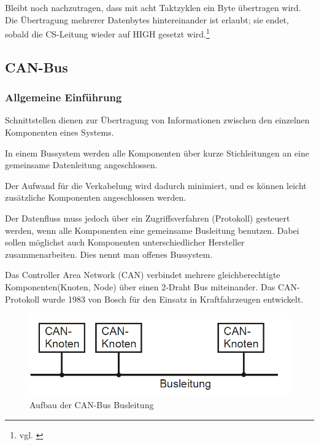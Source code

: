 Bleibt noch nachzutragen, dass mit acht Taktzyklen ein Byte übertragen wird. Die Übertragung mehrerer Datenbytes hintereinander ist erlaubt; sie endet, sobald die CS-Leitung wieder auf HIGH gesetzt wird.\footnote{vgl. \cite{SPI}}

\newpage

\subsection{CAN-Bus}

\subsubsection{Allgemeine Einführung}

Schnittstellen dienen zur Übertragung von Informationen zwischen den einzelnen Komponenten eines Systems.

In einem Bussystem werden alle Komponenten über kurze Stichleitungen an eine gemeinsame Datenleitung angeschlossen.

Der Aufwand für die Verkabelung wird dadurch minimiert, und es können leicht zusätzliche Komponenten angeschlossen werden.

Der Datenfluss muss jedoch über ein Zugriffsverfahren (Protokoll) gesteuert werden, wenn alle Komponenten eine gemeinsame Busleitung benutzen. Dabei sollen möglichst auch Komponenten unterschiedlicher Hersteller zusammenarbeiten. Dies nennt man offenes Bussystem.

Das Controller Area Network (CAN) verbindet mehrere gleichberechtigte Komponenten(Knoten, Node) über einen 2-Draht Bus miteinander. Das CAN-Protokoll wurde 1983 von Bosch für den Einsatz in Kraftfahrzeugen entwickelt.

\begin{figure}[H]
	\begin{center}	
		\includegraphics[scale=0.35]{figures/hcis/can_busleitung.png}
		\caption{Aufbau der CAN-Bus Busleitung}
		\label{abb:CAN_Busleitung}
	\end{center}
\end{figure}

